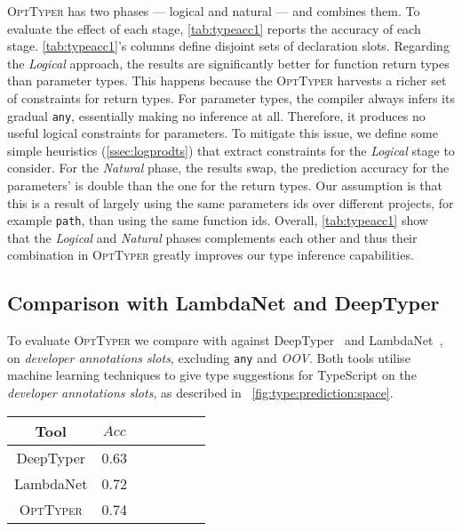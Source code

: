 \documentclass[acmsmall, review, anonymous]{acmart}\settopmatter{printfolios=true,printccs=false,printacmref=false}
\newcommand{\projectname}{\textsc{OptTyper}\xspace}
\begin{document}
\projectname has two phases --- logical and natural --- and combines them.  To evaluate the effect of each stage, \cref{tab:typeacc1} reports the accuracy of each stage.
\cref{tab:typeacc1}'s columns define disjoint sets of declaration slots.
Regarding the \textit{Logical} approach, the results are significantly better for function return types
than parameter types.
This happens because the \projectname harvests a richer set of constraints for return types.
For parameter types, the compiler always 
infers its gradual \lstinline{any}, essentially making no inference at all. Therefore, it produces no useful logical constraints for parameters.
To mitigate this issue, we define some simple heuristics (\cref{ssec:logprodts}) that extract constraints for the \textit{Logical} stage to consider.  
For the \textit{Natural} phase, the results swap, the prediction accuracy for the parameters' is double than the one for the return types. Our assumption is that
this is a result of largely using the same parameters ids over different projects, for example \lstinline{path}, than using the same function ids.
Overall, \cref{tab:typeacc1} show that the \textit{Logical} and \textit{Natural} phases complements each other and thus their combination in \projectname greatly improves our type inference capabilities.

\subsection{Comparison with LambdaNet and DeepTyper}
\label{ssec:typesubproblem}

To evaluate \projectname we compare with 
against DeepTyper~\cite{hellendoorn18} and
LambdaNet~\cite{wei20}, on \textit{developer annotations slots}, excluding \lstinline{any} and \textit{OOV}. Both tools utilise machine learning techniques to give type suggestions for TypeScript on the \emph{developer annotations slots}, as described in ~\cref{fig:type:prediction:space}.

\begin{table*}[t]
	\centering
	\caption{Accuracy for DeepTyper, LambdaNet and OptTyper; on $600$ annotations slots.}
		\label{tab:typeacc2}
	\begin{tabular}{ccccccc}
		\toprule
		Tool   &                              $Acc$ \\
		\midrule
		DeepTyper  & 0.63 \\
		LambdaNet  & 0.72 \\
		\projectname & 0.74\\
		\bottomrule
	\end{tabular}
\end{table*}
\end{document}
